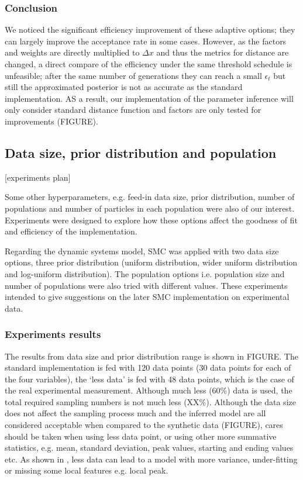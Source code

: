 \documentclass[12pt,a4paper]{report}
\begin{document}
\subsubsection{Conclusion} We noticed the significant efficiency improvement of these adaptive options; they can largely improve the acceptance rate in some cases. However, as the factors and weights are directly multiplied to $\Delta x$ and thus the metrics for distance are changed, a direct compare of the efficiency under the same threshold schedule is unfeasible; after the same number of generations they can reach a small $\epsilon_t$ but still the approximated posterior is not as accurate as the standard implementation. AS a result, our implementation of the parameter inference will only consider standard distance function and factors are only tested for improvements (FIGURE).


\subsection{Data size, prior distribution and population}

[experiments plan]

Some other hyperparameters, e.g. feed-in data size, prior distribution, number of populations and number of particles in each population were also of our interest. Experiments were designed to explore how these options affect the goodness of fit and efficiency of the implementation.

Regarding the dynamic systems model, SMC was applied with two data size options, three prior distribution (uniform distribution, wider uniform distribution and log-uniform distribution). The population options i.e. population size and number of populations were also tried with different values. These experiments intended to give suggestions on the later SMC implementation on experimental data.

\subsubsection{Experiments results}

The results from data size and prior distribution range is shown in FIGURE. The standard implementation is fed with 120 data points (30 data points for each of the four variables), the `less data' is fed with 48 data points, which is the case of the real experimental measurement. Although much less (60\%) data is used, the total required sampling numbers is not much less (XX\%). Although the data size does not affect the sampling process much and the inferred model are all considered acceptable when compared to the synthetic data (FIGURE), cares should be taken when using less data point, or using other more summative statistics, e.g. mean, standard deviation, peak values, starting and ending values etc. As shown in \cite{ref:disease}, less data can lead to a model with more variance, under-fitting or missing some local features e.g. local peak.
\end{document}
